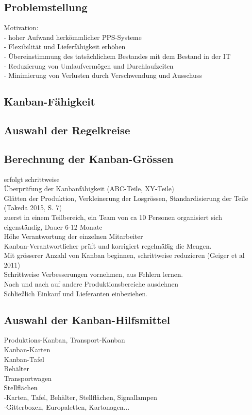 \subsection{Problemstellung}
Motivation: \\
- hoher Aufwand herkömmlicher PPS-Systeme\\
- Flexibilität und Lieferfähigkeit erhöhen\\
- Übereinstimmung des tatsächlichem Bestandes mit dem Bestand in der IT\\
- Reduzierung von Umlaufvermögen und Durchlaufzeiten\\
- Minimierung von Verlusten durch Verschwendung und Ausschuss\\
\subsection{Kanban-Fähigkeit}
\subsection{Auswahl der Regelkreise}
\subsection{Berechnung der Kanban-Grössen}

erfolgt schrittweise\\
Überprüfung der Kanbanfähigkeit (ABC-Teile, XY-Teile)\\
Glätten der Produktion, Verkleinerung der Losgrössen, Standardisierung der Teile (Takeda 2015, S. 7)\\
zuerst in einem Teilbereich, ein Team von ca 10 Personen organisiert sich eigenständig, Dauer 6-12 Monate\\
Höhe Verantwortung der einzelnen Mitarbeiter\\
Kanban-Verantwortlicher prüft und korrigiert regelmäßig die Mengen.\\

Mit grösserer Anzahl von Kanban beginnen, schrittweise reduzieren (Geiger et al 2011)\\
Schrittweise Verbesserungen vornehmen, aus Fehlern lernen.\\
Nach und nach auf andere Produktionsbereiche ausdehnen\\
Schließlich Einkauf und Lieferanten einbeziehen.\\

\subsection{Auswahl der Kanban-Hilfsmittel}
Produktions-Kanban, Transport-Kanban\\
Kanban-Karten\\
Kanban-Tafel\\
Behälter\\
Transportwagen\\
Stellflächen\\
-Karten, Tafel, Behälter, Stellflächen, Signallampen\\
-Gitterboxen, Europaletten, Kartonagen...\\

